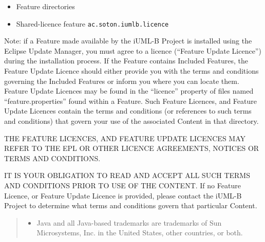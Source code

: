 \begin{itemize}
\item Feature directories

\item Shared-licence feature \texttt{ac.soton.iumlb.licence}
\end{itemize}

Note: if a Feature made available by the iUML-B Project is
installed using the Eclipse Update Manager, you must agree to a
licence (``Feature Update Licence'') during the installation process.
If the Feature contains Included Features, the Feature Update
Licence should either provide you with the terms and conditions
governing the Included Features or inform you where you can locate
them.  Feature Update Licences may be found in the ``licence''
property of files named ``feature.properties'' found within a
Feature.  Such Feature Licences, and Feature Update
Licences contain the terms and conditions (or references to such
terms and conditions) that govern your use of the associated
Content in that directory.

THE FEATURE LICENCES, AND FEATURE UPDATE LICENCES MAY REFER
TO THE EPL OR OTHER LICENCE AGREEMENTS, NOTICES OR TERMS AND
CONDITIONS.

IT IS YOUR OBLIGATION TO READ AND ACCEPT ALL SUCH TERMS AND
CONDITIONS PRIOR TO USE OF THE CONTENT.  If no Feature
Licence, or Feature Update Licence is provided, please contact the
iUML-B Project to determine what terms and conditions govern
that particular Content.
\begin{quote}
  \footnotesize

  \begin{itemize}
  \item  Java and all Java-based trademarks are trademarks of Sun
    Microsystems, Inc. in the United States, other countries, or
    both.
  \end{itemize}
\end{quote}

